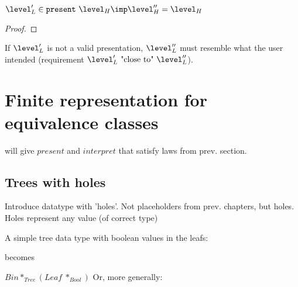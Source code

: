 $\level'_L \in \present~\level_H \imp \level''_H = \level_H$\\

\begin{proof} 
\end{proof}


\bl
\* If $\level'_{L}$ is not a valid presentation, $\level''_{L}$ must resemble what the user intended (requirement $\level'_{L}~\text{"close to"}~\level''_{L}$).
\el



\section{Finite representation for equivalence classes}

will give $present$ and $interpret$ that satisfy laws from prev. section.

\subsection{Trees with holes}
Introduce datatype with 'holes'. Not placeholders from prev. chapters, but holes. Holes represent any value (of correct type)

A simple tree data type with boolean values in the leafs:


becomes


$Bin *_{Tree} (Leaf~*_{Bool})$ 
Or, more generally:



